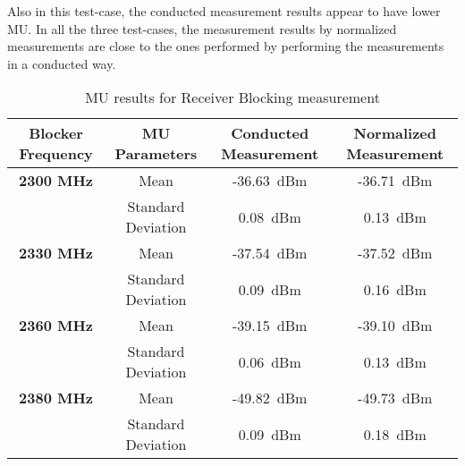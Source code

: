 Also in this test-case, the conducted measurement results appear to have lower \acs{MU}. In all the three test-cases, the measurement results by normalized measurements are close to the ones performed by performing the measurements in a conducted way.
\begin{table}[H]
\resizebox{\textwidth}{!}
{
        \begin{tabular}{|c|c|c|c|}\toprule
         \textbf{Blocker Frequency} & \textbf{MU Parameters} &\textbf{Conducted Measurement} & \textbf{Normalized Measurement} \\
            \midrule
            \textbf{2300 MHz} & Mean                      & -36.63~dBm & -36.71~dBm \\
                             & Standard Deviation & 0.08~dBm    & 0.13~dBm  \\
                             \midrule
            \textbf{2330 MHz} & Mean                      & -37.54~dBm & -37.52~dBm       \\
                             & Standard Deviation & 0.09~dBm    & 0.16~dBm       \\
                             \midrule
            \textbf{2360 MHz} & Mean                      & -39.15~dBm & -39.10~dBm     \\
                             & Standard Deviation & 0.06~dBm    & 0.13~dBm      \\
                             \midrule
            \textbf{2380 MHz} & Mean                      & -49.82~dBm & -49.73~dBm       \\
                             & Standard Deviation & 0.09~dBm    & 0.18~dBm \\
           \bottomrule
        \end{tabular}}
        \caption{\acf{MU} results for Receiver Blocking measurement}\label{tab:Tab3}
 \end{table} 




